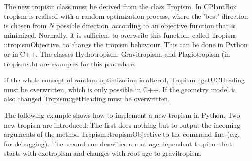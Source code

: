 The new tropism class must be derived from the class Tropism. In CPlantBox tropism is realised with a random optimization process, where the 'best' direction is chosen from $N$ possible direction, according to an objective function that is minimized. Normally, it is sufficient to overwrite this function, called Tropism ::tropismObjective, to change the tropism behaviour. This can be done in Python or in C++. The classes Hydrotropism, Gravitropism, and Plagiotropism (in tropisms.h) are examples for this procedure.

If the whole concept of random optimization is altered, Tropism ::getUCHeading must be overwritten, which is only possible in C++. If the geometry model is also changed Tropism::getHeading must be overwritten.

The following example shows how to implement a new tropism in Python. Two new tropism are introduced:
The first does nothing but to output the incoming arguments of the method Tropism::tropismObjective to the command line (e.g. for debugging). The second one describes a root age dependent tropism that starts with exotropism and changes with root age to gravitropism.



